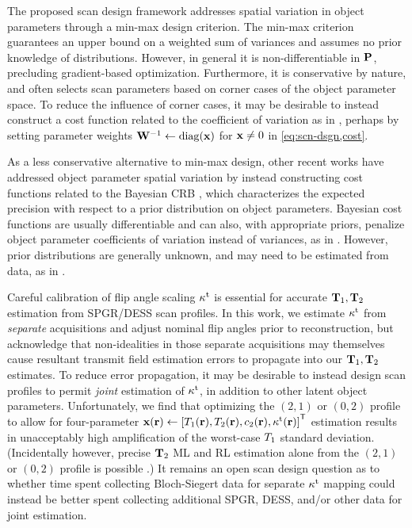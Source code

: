 The proposed scan design framework addresses spatial variation 
in object parameters through a min-max design criterion.
The min-max criterion guarantees an upper bound 
on a weighted sum of variances 
and assumes no prior knowledge of distributions.
However, in general it is non-differentiable 
in $\mathbf{P}$, precluding gradient-based optimization. 	
Furthermore, it is conservative by nature, 
and often selects scan parameters based 
on corner cases of the object parameter space.
To reduce the influence of corner cases, 
it may be desirable to instead construct a cost function 
related to the coefficient of variation 
as in \cite{jones:96:oss, zhang:98:dos, imran:99:tpm, deoni:04:doo}, 
perhaps by setting parameter weights $\bmW^{-1} \gets \diag{\bmx}$ 
for $\mathbf{x} \neq 0$ in \eqref{eq:scn-dsgn,cost}.
	
As a less conservative alternative 
to min-max design, 
other recent works \cite{akcakaya:15:ots, lewis:16:ddo} 
have addressed object parameter spatial variation 
by instead constructing cost functions related 
to the Bayesian CRB \cite{gill:95:aot}, 
which characterizes the expected precision 
with respect to a prior distribution on object parameters.
Bayesian cost functions are usually differentiable and can also, 
with appropriate priors, 
penalize object parameter coefficients of variation 
instead of variances, 
as in \cite{akcakaya:15:ots}.
However, prior distributions are generally unknown, 
and may need to be estimated from data, 
as in \cite{lewis:16:ddo}.

Careful calibration of flip angle scaling $\kappa^{\mathrm{t}}$ is essential 
for accurate $\mathbf{T}_1, \mathbf{T}_2$ estimation 
from SPGR/DESS scan profiles. 
In this work, we estimate $\kappa^{\mathrm{t}}$ 
from \emph{separate} acquisitions 
and adjust nominal flip angles prior to reconstruction, 
but acknowledge that non-idealities 
in those separate acquisitions may themselves 
cause resultant transmit field estimation errors 
to propagate into our $\mathbf{T}_1,\mathbf{T}_2$ estimates. 
To reduce error propagation, 
it may be desirable to instead design scan profiles 
to permit \emph{joint} estimation of $\kappa^{\mathrm{t}}$, 
in addition to other latent object parameters.
Unfortunately, 
we find that optimizing the $(2,1)$ or $(0,2)$ profile 
to allow for four-parameter 
$\bmx\pr \gets \brac{\To\pr, \Tt\pr, \const{2}\pr, \stx\pr}\tpose$ estimation 
results in unacceptably high amplification 
of the worst-case $T_1$ standard deviation. 
(Incidentally however, precise $\mathbf{T}_2$ ML and RL estimation alone 
from the $(2,1)$ or $(0,2)$ profile 
is possible \cite{nataraj:14:mbe}.) 
It remains an open scan design question 
as to whether time spent collecting Bloch-Siegert data 
for separate $\kappa^{\mathrm{t}}$ mapping could instead be better spent 
collecting additional SPGR, DESS, 
and/or other data for joint estimation.

